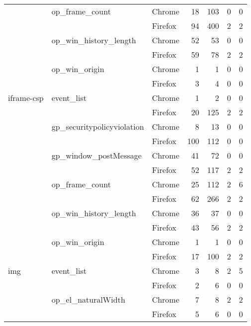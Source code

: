 \begin{tabular}{lllrrrr}
            & op\_frame\_count & Chrome &     18 &   103 &         0 &        0 \\
            &               & Firefox &     94 &   400 &         2 &        2 \\
            & op\_win\_history\_length & Chrome &     52 &    53 &         0 &        0 \\
            &               & Firefox &     59 &    78 &         2 &        2 \\
            & op\_win\_origin & Chrome &      1 &     1 &         0 &        0 \\
            &               & Firefox &      3 &     4 &         0 &        0 \\
iframe-csp & event\_list & Chrome &      1 &     2 &         0 &        0 \\
            &               & Firefox &     20 &   125 &         2 &        2 \\
            & gp\_securitypolicyviolation & Chrome &      8 &    13 &         0 &        0 \\
            &               & Firefox &    100 &   112 &         0 &        0 \\
            & gp\_window\_postMessage & Chrome &     41 &    72 &         0 &        0 \\
            &               & Firefox &     52 &   117 &         2 &        2 \\
            & op\_frame\_count & Chrome &     25 &   112 &         2 &        6 \\
            &               & Firefox &     62 &   266 &         2 &        2 \\
            & op\_win\_history\_length & Chrome &     36 &    37 &         0 &        0 \\
            &               & Firefox &     43 &    56 &         2 &        2 \\
            & op\_win\_origin & Chrome &      1 &     1 &         0 &        0 \\
            &               & Firefox &     17 &   100 &         2 &        2 \\
img & event\_list & Chrome &      3 &     8 &         2 &        5 \\
            &               & Firefox &      2 &     6 &         0 &        0 \\
            & op\_el\_naturalWidth & Chrome &      7 &     8 &         2 &        2 \\
            &               & Firefox &      5 &     6 &         0 &        0 \\

\end{tabular}
